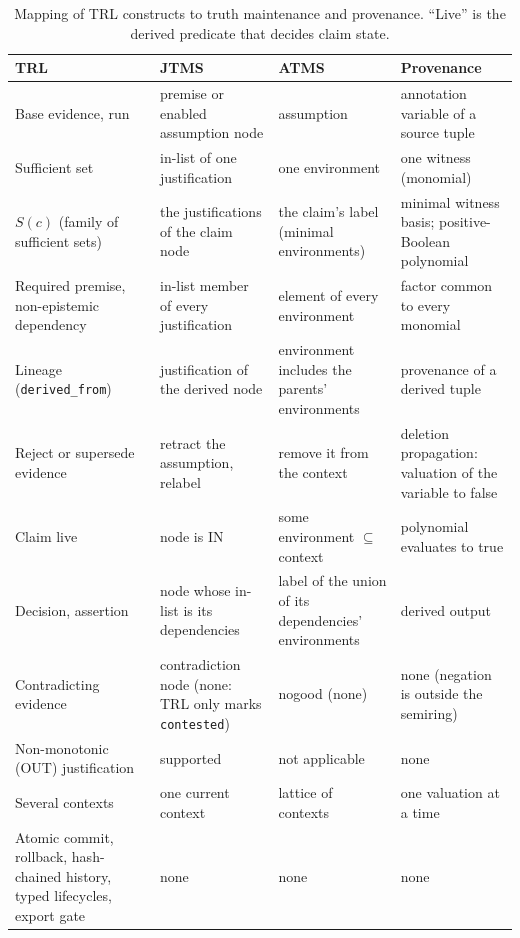 \documentclass[journal]{IEEEtran}
\begin{document}
\begin{table}[!t]
\centering
\caption{Mapping of TRL constructs to truth maintenance and provenance. ``Live'' is the derived predicate that decides claim state.}
\label{tab:tms_map}
\scriptsize
\begin{tabularx}{\textwidth}{>{\raggedright\arraybackslash}p{2.9cm}>{\raggedright\arraybackslash}X>{\raggedright\arraybackslash}X>{\raggedright\arraybackslash}X}
\toprule
TRL & JTMS \cite{doyle1979tms} & ATMS \cite{dekleer1986atms} & Provenance \cite{buneman2001provenance,green2007provenance} \\
\midrule
Base evidence, run & premise or enabled assumption node & assumption & annotation variable of a source tuple \\
Sufficient set & in-list of one justification & one environment & one witness (monomial) \\
$S(c)$ (family of sufficient sets) & the justifications of the claim node & the claim's label (minimal environments) & minimal witness basis; positive-Boolean polynomial \\
Required premise, non-epistemic dependency & in-list member of every justification & element of every environment & factor common to every monomial \\
Lineage (\texttt{derived\_from}) & justification of the derived node & environment includes the parents' environments & provenance of a derived tuple \\
Reject or supersede evidence & retract the assumption, relabel & remove it from the context & deletion propagation: valuation of the variable to false \\
Claim live & node is IN & some environment $\subseteq$ context & polynomial evaluates to true \\
Decision, assertion & node whose in-list is its dependencies & label of the union of its dependencies' environments & derived output \\
Contradicting evidence & contradiction node (none: TRL only marks \texttt{contested}) & nogood (none) & none (negation is outside the semiring) \\
Non-monotonic (OUT) justification & supported & not applicable & none \\
Several contexts & one current context & lattice of contexts & one valuation at a time \\
Atomic commit, rollback, hash-chained history, typed lifecycles, export gate & none & none & none \\
\bottomrule
\end{tabularx}
\end{table}
\end{document}
